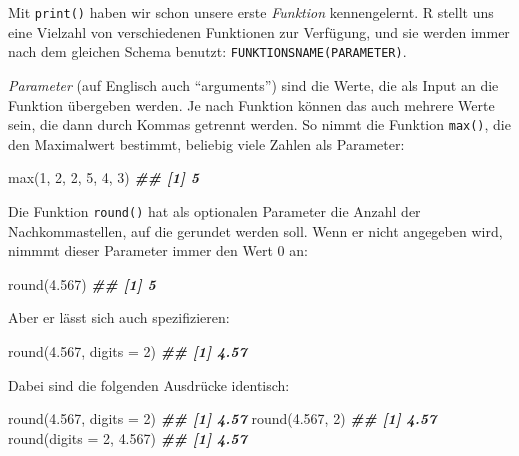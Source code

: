 \documentclass[
  ngerman,
]{article}
\newenvironment{Shaded}{\begin{snugshade}}{\end{snugshade}}
\newcommand{\AttributeTok}[1]{\textcolor[rgb]{0.77,0.63,0.00}{#1}}
\newcommand{\DecValTok}[1]{\textcolor[rgb]{0.00,0.00,0.81}{#1}}
\newcommand{\DocumentationTok}[1]{\textcolor[rgb]{0.56,0.35,0.01}{\textbf{\textit{#1}}}}
\newcommand{\FloatTok}[1]{\textcolor[rgb]{0.00,0.00,0.81}{#1}}
\newcommand{\FunctionTok}[1]{\textcolor[rgb]{0.00,0.00,0.00}{#1}}
\newcommand{\NormalTok}[1]{#1}
\begin{document}
Mit \texttt{print()} haben wir schon unsere erste \emph{Funktion} kennengelernt. R stellt uns eine Vielzahl von verschiedenen Funktionen zur Verfügung, und sie werden immer nach dem gleichen Schema benutzt: \texttt{FUNKTIONSNAME(PARAMETER)}.

\emph{Parameter} (auf Englisch auch ``arguments'') sind die Werte, die als Input an die Funktion übergeben werden. Je nach Funktion können das auch mehrere Werte sein, die dann durch Kommas getrennt werden. So nimmt die Funktion \texttt{max()}, die den Maximalwert bestimmt, beliebig viele Zahlen als Parameter:

\begin{Shaded}
\begin{Highlighting}[]
\FunctionTok{max}\NormalTok{(}\DecValTok{1}\NormalTok{, }\DecValTok{2}\NormalTok{, }\DecValTok{2}\NormalTok{, }\DecValTok{5}\NormalTok{, }\DecValTok{4}\NormalTok{, }\DecValTok{3}\NormalTok{)}
\DocumentationTok{\#\# [1] 5}
\end{Highlighting}
\end{Shaded}

Die Funktion \texttt{round()} hat als optionalen Parameter die Anzahl der Nachkommastellen, auf die gerundet werden soll. Wenn er nicht angegeben wird, nimmmt dieser Parameter immer den Wert 0 an:

\begin{Shaded}
\begin{Highlighting}[]
\FunctionTok{round}\NormalTok{(}\FloatTok{4.567}\NormalTok{)}
\DocumentationTok{\#\# [1] 5}
\end{Highlighting}
\end{Shaded}

Aber er lässt sich auch spezifizieren:

\begin{Shaded}
\begin{Highlighting}[]
\FunctionTok{round}\NormalTok{(}\FloatTok{4.567}\NormalTok{, }\AttributeTok{digits =} \DecValTok{2}\NormalTok{)}
\DocumentationTok{\#\# [1] 4.57}
\end{Highlighting}
\end{Shaded}

Dabei sind die folgenden Ausdrücke identisch:

\begin{Shaded}
\begin{Highlighting}[]
\FunctionTok{round}\NormalTok{(}\FloatTok{4.567}\NormalTok{, }\AttributeTok{digits =} \DecValTok{2}\NormalTok{)}
\DocumentationTok{\#\# [1] 4.57}
\FunctionTok{round}\NormalTok{(}\FloatTok{4.567}\NormalTok{, }\DecValTok{2}\NormalTok{)}
\DocumentationTok{\#\# [1] 4.57}
\FunctionTok{round}\NormalTok{(}\AttributeTok{digits =} \DecValTok{2}\NormalTok{, }\FloatTok{4.567}\NormalTok{)}
\DocumentationTok{\#\# [1] 4.57}
\end{Highlighting}
\end{Shaded}
\end{document}
